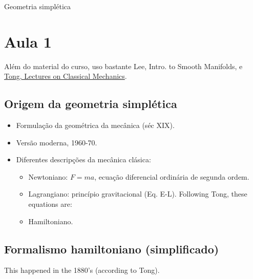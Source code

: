 
\renewcommand{\curvearrowright}{\mathbb{y}}
\renewcommand{\curvearrowleft}{\mathbb{x}}




{\Huge Geometria simpl\'etica}

\tableofcontents

\section{Aula 1}
Além do material do curso, uso bastante Lee, Intro. to Smooth Manifolds, e \href{https://www.damtp.cam.ac.uk/user/tong/dynamics.html}{Tong, Lectures on Classical Mechanics}.

\subsection{Origem da geometria simpl\'etica}
\begin{itemize}
	\item Formula\c c\~ao da geom\'etrica da mec\^anica (s\'ec XIX).
	\item Vers\~ao moderna, 1960-70.
	\item Diferentes descrip\c c\~oes da mec\^anica cl\'asica:
		\begin{itemize}
			\item Newtoniano: $F=ma$, ecua\c c\~ao diferencial ordin\'aria de segunda ordem.
			\item Lagrangiano: princ\'ipio gravitacional (Eq. E-L). Following Tong, these equations are:

			\item Hamiltoniano.
		\end{itemize}
\end{itemize}

\subsection{Formalismo hamiltoniano (simplificado)}

This happened in the 1880's (according to Tong).


